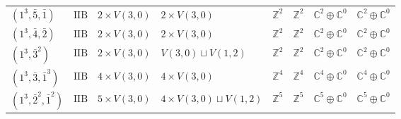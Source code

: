 \documentclass[11pt,a4paper]{article}
\begin{document}
\begin{appendix}
\begin{table}
\begin{tabular}{C{2.65cm}C{0.85cm}C{3.0cm}C{3.0cm}C{2.25cm}C{2.25cm}C{1.55cm}C{1.55cm}}
\((1^{3}, \bar{5}, \bar{1})\) & \(\mathrm{IIB}\) & \(2 \times V(3,0)\) & \(2 \times V(3,0)\) & \(\mathbb{Z}^{2}\) & \(\mathbb{Z}^{2}\) & \(\mathbb{C}^{2} \oplus \mathbb{C}^{0}\) & \(\mathbb{C}^{2} \oplus \mathbb{C}^{0}\) \\
\((1^{3}, \bar{4}, \bar{2})\) & \(\mathrm{IIB}\) & \(2 \times V(3,0)\) & \(2 \times V(3,0)\) & \(\mathbb{Z}^{2}\) & \(\mathbb{Z}^{2}\) & \(\mathbb{C}^{2} \oplus \mathbb{C}^{0}\) & \(\mathbb{C}^{2} \oplus \mathbb{C}^{0}\) \\
\((1^{3}, \bar{3}^{2})\) & \(\mathrm{IIB}\) & \(2 \times V(3,0)\) & \(V(3,0) \sqcup V(1,2)\) & \(\mathbb{Z}^{2}\) & \(\mathbb{Z}^{2}\) & \(\mathbb{C}^{2} \oplus \mathbb{C}^{0}\) & \(\mathbb{C}^{2} \oplus \mathbb{C}^{0}\) \\
\((1^{3}, \bar{3}, \bar{1}^{3})\) & \(\mathrm{IIB}\) & \(4 \times V(3,0)\) & \(4 \times V(3,0)\) & \(\mathbb{Z}^{4}\) & \(\mathbb{Z}^{4}\) & \(\mathbb{C}^{4} \oplus \mathbb{C}^{0}\) & \(\mathbb{C}^{4} \oplus \mathbb{C}^{0}\) \\
\((1^{3}, \bar{2}^{2}, \bar{1}^{2})\) & \(\mathrm{IIB}\) & \(5 \times V(3,0)\) & \(4 \times V(3,0) \sqcup V(1,2)\) & \(\mathbb{Z}^{5}\) & \(\mathbb{Z}^{5}\) & \(\mathbb{C}^{5} \oplus \mathbb{C}^{0}\) & \(\mathbb{C}^{5} \oplus \mathbb{C}^{0}\) \\
\bottomrule
\end{tabular}
\end{table}




\end{appendix}
\end{document}
